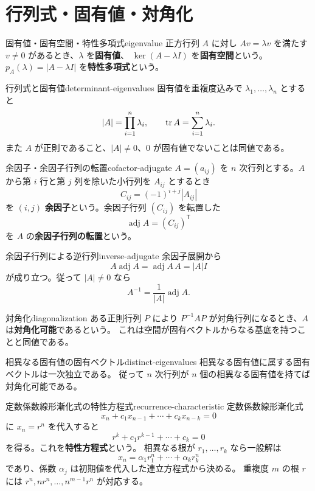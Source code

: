 \section{行列式・固有値・対角化}

\begin{definition}{固有値・固有空間・特性多項式}{eigenvalue}
正方行列 $A$ に対し $Av=\lambda v$ を満たす $v\ne0$ があるとき、$\lambda$ を\textbf{固有値}、
$\ker(A-\lambda I)$ を\textbf{固有空間}という。
$p_A(\lambda)=|A-\lambda I|$ を\textbf{特性多項式}という。
\end{definition}

\begin{proposition}{行列式と固有値}{determinant-eigenvalues}
固有値を重複度込みで $\lambda_1,\ldots,\lambda_n$ とすると
\[
  |A|=\prod_{i=1}^n\lambda_i,
  \qquad \operatorname{tr} A=\sum_{i=1}^n\lambda_i.
\]
また $A$ が正則であること、$|A|\ne0$、$0$ が固有値でないことは同値である。
\end{proposition}

\begin{definition}{余因子・余因子行列の転置}{cofactor-adjugate}
$A=(a_{ij})$ を $n$ 次行列とする。$A$ から第 $i$ 行と第 $j$ 列を除いた小行列を
$A_{ij}$ とするとき
\[
C_{ij}=(-1)^{i+j}|A_{ij}|
\]
を $(i,j)$ \textbf{余因子}という。余因子行列 $(C_{ij})$ を転置した
\[
\operatorname{adj}A=(C_{ij})^{\mathsf T}
\]
を $A$ の\textbf{余因子行列の転置}という。
\end{definition}

\begin{proposition}{余因子行列による逆行列}{inverse-adjugate}
余因子展開から
\[
A\operatorname{adj}A
=\operatorname{adj}A\,A
=|A|I
\]
が成り立つ。従って $|A|\ne0$ なら
\[
A^{-1}=\frac1{|A|}\operatorname{adj}A.
\]
\end{proposition}

\begin{definition}{対角化}{diagonalization}
ある正則行列 $P$ により $P^{-1}AP$ が対角行列になるとき、$A$ は\textbf{対角化可能}であるという。
これは空間が固有ベクトルからなる基底を持つことと同値である。
\end{definition}

\begin{theorem}{相異なる固有値の固有ベクトル}{distinct-eigenvalues}
相異なる固有値に属する固有ベクトルは一次独立である。
従って $n$ 次行列が $n$ 個の相異なる固有値を持てば対角化可能である。
\end{theorem}

\begin{proposition}{定数係数線形漸化式の特性方程式}{recurrence-characteristic}
定数係数線形漸化式
\[
x_n+c_1x_{n-1}+\cdots+c_kx_{n-k}=0
\]
に $x_n=r^n$ を代入すると
\[
r^k+c_1r^{k-1}+\cdots+c_k=0
\]
を得る。これを\textbf{特性方程式}という。
相異なる根が $r_1,\ldots,r_k$ なら一般解は
\[
x_n=\alpha_1r_1^n+\cdots+\alpha_kr_k^n
\]
であり、係数 $\alpha_j$ は初期値を代入した連立方程式から決める。
重複度 $m$ の根 $r$ には
$r^n,nr^n,\ldots,n^{m-1}r^n$ が対応する。
\end{proposition}

